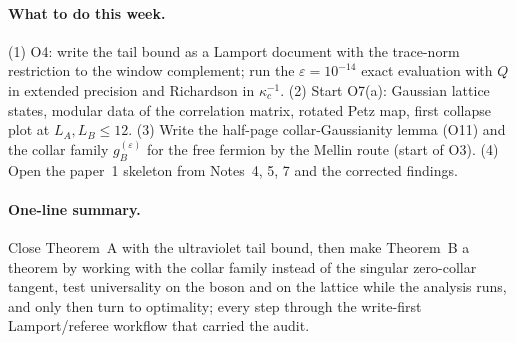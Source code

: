 \documentclass[11pt]{article}
\theoremstyle{accent}
\theoremstyle{definition}
\newcommand{\eps}{\varepsilon}
\begin{document}
\paragraph{What to do this week.}
(1) O4: write the tail bound as a Lamport document with the trace-norm restriction to the window complement; run the \(\eps=10^{-14}\) exact evaluation with \(Q\) in extended precision and Richardson in \(\kappa_c^{-1}\).  (2) Start O7(a): Gaussian lattice states, modular data of the correlation matrix, rotated Petz map, first collapse plot at \(L_A,L_B\le12\).  (3) Write the half-page collar-Gaussianity lemma (O11) and the collar family \(g_B^{(\eps)}\) for the free fermion by the Mellin route (start of O3).  (4) Open the paper~1 skeleton from Notes~4, 5, 7 and the corrected findings.

\paragraph{One-line summary.}
Close Theorem~A with the ultraviolet tail bound, then make Theorem~B a theorem by working with the collar family instead of the singular zero-collar tangent, test universality on the boson and on the lattice while the analysis runs, and only then turn to optimality; every step through the write-first Lamport/referee workflow that carried the audit.
\end{document}
